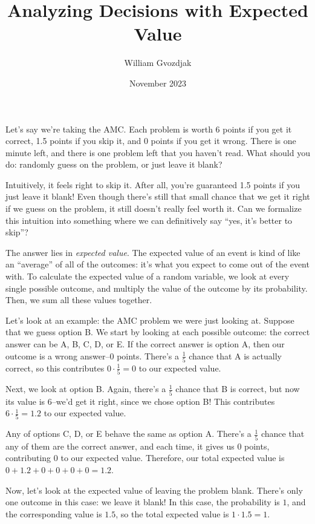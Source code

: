 \documentclass{article}
\title{Analyzing Decisions with Expected Value}
\author{William Gvozdjak}
\date{November 2023}
\begin{document}
\maketitle

Let's say we're taking the AMC. Each problem is worth 6 points if you get it correct, 1.5 points if you skip it, and 0 points if you get it wrong. There is one minute left, and there is one problem left that you haven't read. What should you do: randomly guess on the problem, or just leave it blank?

Intuitively, it feels right to skip it. After all, you're guaranteed 1.5 points if you just leave it blank! Even though there's still that small chance that we get it right if we guess on the problem, it still doesn't really feel worth it. Can we formalize this intuition into something where we can definitively say ``yes, it's better to skip''?

The answer lies in \emph{expected value}. The expected value of an event is kind of like an ``average'' of all of the outcomes: it's what you expect to come out of the event with. To calculate the expected value of a random variable, we look at every single possible outcome, and multiply the value of the outcome by its probability. Then, we sum all these values together.

Let's look at an example: the AMC problem we were just looking at. Suppose that we guess option B. We start by looking at each possible outcome: the correct answer can be A, B, C, D, or E. If the correct answer is option A, then our outcome is a wrong answer--0 points. There's a $\frac{1}{5}$ chance that A is actually correct, so this contributes $0\cdot\frac{1}{5}=0$ to our expected value.

Next, we look at option B. Again, there's a $\frac{1}{5}$ chance that B is correct, but now its value is $6$--we'd get it right, since we chose option B! This contributes $6\cdot\frac{1}{5}=1.2$ to our expected value.

Any of options C, D, or E behave the same as option A. There's a $\frac{1}{5}$ chance that any of them are the correct answer, and each time, it gives us $0$ points, contributing $0$ to our expected value. Therefore, our total expected value is $0+1.2+0+0+0+0=1.2$.

Now, let's look at the expected value of leaving the problem blank. There's only one outcome in this case: we leave it blank! In this case, the probability is $1$, and the corresponding value is $1.5$, so the total expected value is $1\cdot 1.5=1$.
\end{document}
